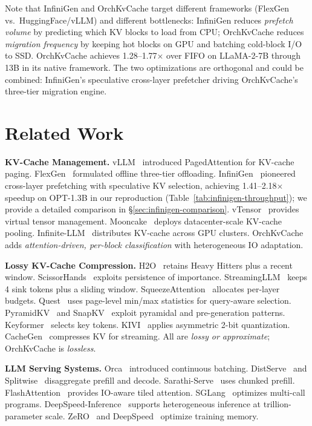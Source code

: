 \documentclass[conference]{IEEEtran}
\begin{document}
Note that InfiniGen and OrchKvCache target different frameworks (FlexGen vs.\ HuggingFace/vLLM) and different bottlenecks: InfiniGen reduces \emph{prefetch volume} by predicting which KV blocks to load from CPU; OrchKvCache reduces \emph{migration frequency} by keeping hot blocks on GPU and batching cold-block I/O to SSD.  OrchKvCache achieves 1.28--1.77$\times$ over FIFO on LLaMA-2-7B through 13B in its native framework.  The two optimizations are orthogonal and could be combined: InfiniGen's speculative cross-layer prefetcher driving OrchKvCache's three-tier migration engine.

\section{Related Work}

\textbf{KV-Cache Management.} vLLM~\cite{vllm} introduced PagedAttention for KV-cache paging. FlexGen~\cite{flexgen} formulated offline three-tier offloading. InfiniGen~\cite{infinigen} pioneered cross-layer prefetching with speculative KV selection, achieving 1.41--2.18$\times$ speedup on OPT-1.3B in our reproduction (Table~\ref{tab:infinigen-throughput}); we provide a detailed comparison in \S\ref{sec:infinigen-comparison}. vTensor~\cite{vtensor} provides virtual tensor management. Mooncake~\cite{mooncake} deploys datacenter-scale KV-cache pooling. Infinite-LLM~\cite{infinitellm} distributes KV-cache across GPU clusters. OrchKvCache adds \emph{attention-driven, per-block classification} with heterogeneous IO adaptation.

\textbf{Lossy KV-Cache Compression.} H2O~\cite{h2o} retains Heavy Hitters plus a recent window. ScissorHands~\cite{scissorhands} exploits persistence of importance. StreamingLLM~\cite{streamingllm} keeps 4 sink tokens plus a sliding window. SqueezeAttention~\cite{squeezeattention} allocates per-layer budgets. Quest~\cite{quest} uses page-level min/max statistics for query-aware selection. PyramidKV~\cite{pyramidkv} and SnapKV~\cite{snapkv} exploit pyramidal and pre-generation patterns. Keyformer~\cite{keyformer} selects key tokens. KIVI~\cite{kivi} applies asymmetric 2-bit quantization. CacheGen~\cite{cachegen} compresses KV for streaming. All are \emph{lossy or approximate}; OrchKvCache is \emph{lossless}.

\textbf{LLM Serving Systems.} Orca~\cite{orca} introduced continuous batching. DistServe~\cite{distserve} and Splitwise~\cite{splitwise} disaggregate prefill and decode. Sarathi-Serve~\cite{sarathi} uses chunked prefill. FlashAttention~\cite{flashattn,flashattn2} provides IO-aware tiled attention. SGLang~\cite{sglang} optimizes multi-call programs. DeepSpeed-Inference~\cite{deepspeed-inf} supports heterogeneous inference at trillion-parameter scale. ZeRO~\cite{zero} and DeepSpeed~\cite{deepspeed} optimize training memory.
\end{document}
